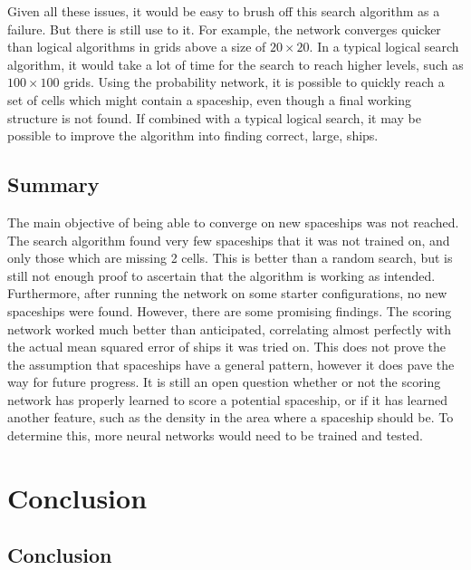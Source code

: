\documentclass{l4proj}
\begin{document}
Given all these issues, it would be easy to brush off this search algorithm as a failure. But there is still use to it. For example, the network converges quicker than logical algorithms in grids above a size of $20 \times 20$. In a typical logical search algorithm, it would take a lot of time for the search to reach higher levels, such as $100 \times 100$ grids. Using the probability network, it is possible to quickly reach a set of cells which might contain a spaceship, even though a final working structure is not found. If combined with a typical logical search, it may be possible to improve the algorithm into finding correct, large, ships.

\section{Summary}

The main objective of being able to converge on new spaceships was not reached. The search algorithm found very few spaceships that it was not trained on, and only those which are missing 2 cells. This is better than a random search, but is still not enough proof to ascertain that the algorithm is working as intended. Furthermore, after running the network on some starter configurations, no new spaceships were found. However, there are some promising findings. The scoring network worked much better than anticipated, correlating almost perfectly with the actual mean squared error of ships it was tried on. This does not prove the the assumption that spaceships have a general pattern, however it does pave the way for future progress. It is still an open question whether or not the scoring network has properly learned to score a potential spaceship, or if it has learned another feature, such as the density in the area where a spaceship should be. To determine this, more neural networks would need to be trained and tested.



\chapter{Conclusion}    

\section{Conclusion}
\end{document}
